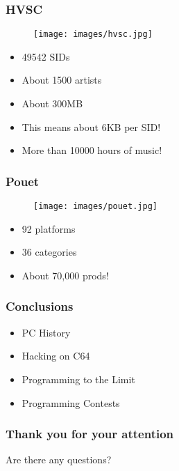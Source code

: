 \documentclass[aspectratio=43]{uva-inf-presentation}
\begin{document}

\begin{frame}
\frametitle{HVSC}

\begin{figure}
\texttt{[image: images/hvsc.jpg]}
\end{figure}

\begin{itemize}
\item 49542 SIDs
\item About 1500 artists
\item About 300MB
\item This means about 6KB per SID!
\item More than 10000 hours of music!
\end{itemize}

\end{frame}


\begin{frame}
\frametitle{Pouet}

\begin{figure}
\texttt{[image: images/pouet.jpg]}
\end{figure}

\begin{itemize}
\item 92 platforms
\item 36 categories
\item About 70,000 prods!
\end{itemize}

\end{frame}


\begin{frame}
\frametitle{Conclusions}

\begin{itemize}
\item PC History
\item Hacking on C64
\item Programming to the Limit
\item Programming Contests
\end{itemize}

\end{frame}





\begin{frame}[noframenumbering]
\frametitle{Thank you for your attention}
\Large{\centerline{Are there any questions?}}
\end{frame}
\end{document}
